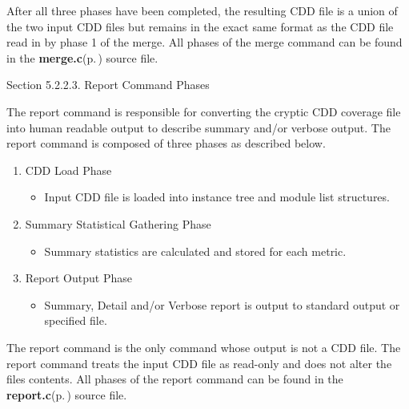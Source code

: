 \begin{Desc}
\item[]After all three phases have been completed, the resulting CDD file is a union of the two input CDD files but remains in the exact same format as the CDD file read in by phase 1 of the merge. All phases of the merge command can be found in the {\bf merge.c}{\rm (p.\,\pageref{merge_8c})} source file.\end{Desc}
\begin{Desc}
\item[Section 5.2.2.3. Report Command Phases]\end{Desc}
\begin{Desc}
\item[]The report command is responsible for converting the cryptic CDD coverage file into human readable output to describe summary and/or verbose output. The report command is composed of three phases as described below.\end{Desc}
\begin{Desc}
\item[]\begin{enumerate}
\item CDD Load Phase \begin{itemize}
\item Input CDD file is loaded into instance tree and module list structures. \end{itemize}
\item Summary Statistical Gathering Phase \begin{itemize}
\item Summary statistics are calculated and stored for each metric. \end{itemize}
\item Report Output Phase \begin{itemize}
\item Summary, Detail and/or Verbose report is output to standard output or specified file. \end{itemize}
\end{enumerate}
\end{Desc}
\begin{Desc}
\item[]The report command is the only command whose output is not a CDD file. The report command treats the input CDD file as read-only and does not alter the files contents. All phases of the report command can be found in the {\bf report.c}{\rm (p.\,\pageref{report_8c})} source file.\end{Desc}




